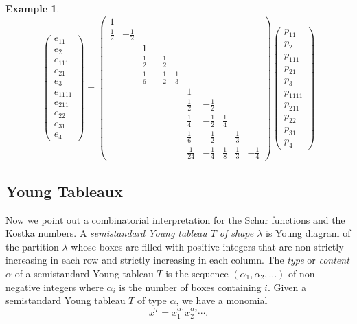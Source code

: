 \documentclass[12pt]{article}
\theoremstyle{plain}
\theoremstyle{definition}
\newtheorem{example}[theorem]{Example}
\theoremstyle{remark}
\numberwithin{equation}{section}
\begin{document}
\begin{example}
\[
\begin{pmatrix} e_{11}\\ e_2\\ e_{111}\\ e_{21}\\ e_3\\
e_{1111}\\ e_{211} \\ e_{22}\\ e_{31}\\ e_4
\end{pmatrix}
=
\begin{pmatrix}
1 & &
 & & &
& & & & \\
\frac{1}{2} & -\frac{1}{2} &
 & & &
& & & & \\
 & &
1 & & &
& & & & \\
 & &
\frac{1}{2} & -\frac{1}{2} &  &
& & & & \\
 & &
\frac{1}{6} & -\frac{1}{2} & \frac{1}{3} &
& & & & \\
 & &
 & & &
1 & & & & \\
 & &
 & & &
\frac{1}{2} & -\frac{1}{2} & & & \\
 & &
 & & &
\frac{1}{4} & -\frac{1}{2} & \frac{1}{4} & & \\
 & &
 & & &
\frac{1}{6} & -\frac{1}{2} & & \frac{1}{3} & \\
 & &
 & & &
\frac{1}{24} & -\frac{1}{4} & \frac{1}{8} & \frac{1}{3} & -\frac{1}{4}
\end{pmatrix} 
\begin{pmatrix}
p_{11}\\ p_2\\ p_{111}\\ p_{21}\\ p_3\\
p_{1111}\\ p_{211} \\ p_{22}\\ p_{31}\\ p_4
\end{pmatrix}
\]
\end{example}

\subsection{Young Tableaux}

Now we point out a combinatorial interpretation for the Schur functions
and the Kostka numbers.
A \emph{semistandard Young tableau $T$ of shape $\lambda$}
is Young diagram of the partition $\lambda$ whose boxes are filled with
positive integers that are non-strictly increasing in each row
and strictly increasing in each column.
The \emph{type} or \emph{content} $\alpha$ of a semistandard Young tableau
$T$ is the sequence
$(\alpha_1,\alpha_2,\ldots)$ of non-negative integers
where $\alpha_i$ is the number of boxes containing $i$.
Given a semistandard Young tableau $T$ of type $\alpha$,
we have a monomial
\[
x^T = x_1^{\alpha_1}x_2^{\alpha_2} \cdots .
\]
\end{document}
